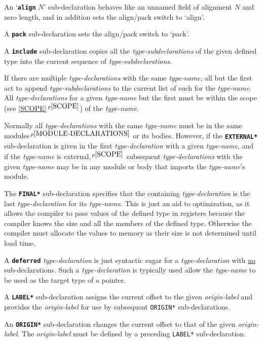 \documentclass[12pt]{article}
\newcommand{\ttkey}[1]{{\tt \bfseries #1}}
\newcommand{\itemref}[1]{\ref{#1}$\,^{p\pageref{#1}}$}
\newcommand{\pagnote}[1]{$\,^{p\pageref{#1}}$}
\begin{document}
An `\ttkey{align} $N$' sub-declaration behaves like an unnamed
field of alignment $N$ and zero length,
and in addition sets the align/pack switch to `align'.

A \ttkey{pack} sub-declaration sets the align/pack switch to `pack'.

A \ttkey{include} sub-declaration copies all the {\em type-subdeclarations}
of the given defined type into the current sequence of
{\em type-subdeclarations}.

If there are multiple {\em type-declarations} with the same
{\em type-name}, all but the first act
to append {\em type-subdeclarations}\label{TYPE-DECLARATION-APPEND}
to the current list of such for the {\em type-name}.
All {\em type-declarations} for a given {\em type-name} but the first
must be within the scope (see \itemref{SCOPE}) of the
{\em type-name}.

Normally all {\em type-declarations} with the same {\em type-name}
must be in the same modules\pagnote{MODULE-DECLARATIONS} or its
bodies.
However, if the \ttkey{*EXTERNAL*}\label{*EXTERNAL*} sub-declaration is given
in the first {\em type-declaration} with a given {\em type-name},
and if the {\em type-name} is external,\pagnote{SCOPE}
subsequent {\em type-declarations} with the given {\em type-name}
may be in any module or body that imports the {\em type-name}'s
module.

The \ttkey{*FINAL*} sub-declaration specifies that the containing
{\em type-declaration} is the last {\em type-declaration} for
its {\em type-name}.  This is just an aid to optimization, as
it allows the compiler to pass values of the defined type in
registers because the compiler knows the size and all the
members of the defined type.  Otherwise the compiler must allocate
the values to memory as their size is not determined until load
time.

A \ttkey{deferred} {\em type-declaration} is just syntactic
sugar for a {\em type-declaration} with \underline{no} sub-declarations.
Such a {\em type-declaration} is typically used allow the {\em type-name}
to be used as the target type of a pointer.

A \ttkey{*LABEL*} sub-declaration assigns the current offset to the
given {\em origin-label} and provides the {\em origin-label}
for use by subsequent {\tt *ORIGIN*} sub-declarations.

An \ttkey{*ORIGIN*} sub-declaration changes the current offset to that
of the given {\em origin-label}.
The {\em origin-label} must be defined by a preceding
{\tt *LABEL*} sub-declaration.
\end{document}
